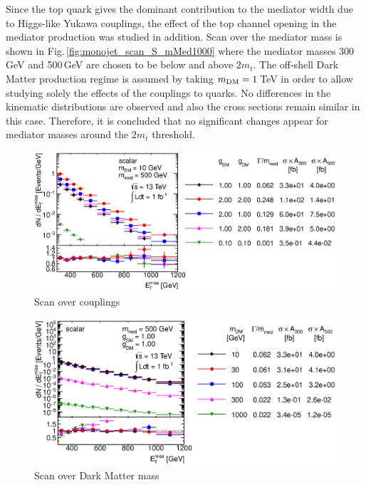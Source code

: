 Since the top quark gives the dominant contribution to the mediator width due to Higgs-like Yukawa couplings, the effect of the top channel opening in the mediator production was studied in addition. Scan over the mediator mass is shown in Fig.\,\ref{fig:monojet_scan_S_mMed1000} where the mediator masses 300\,GeV and 500\,GeV are chosen to be below and above $2m_t$. The off-shell Dark Matter production regime is assumed by taking $m_{\rm{DM}}=1$\,TeV in order to allow studying solely the effects of the couplings to quarks. 
No differences in the kinematic distributions are observed and also the cross sections remain similar in this case. Therefore, it is concluded that no significant changes appear for mediator masses around the $2m_t$ threshold.

\begin{figure}
\centering
\includegraphics[width=0.9\linewidth]{figures/monojet/scan_g_S_10_500.eps}
\caption{Scan over couplings}
\label{fig:monojet_scan_S_g}
\end{figure}

\begin{figure}
\centering
\includegraphics[width=0.9\linewidth]{figures/monojet/scan_mDM_S_500.eps}
\caption{Scan over Dark Matter mass}
\label{fig:monojet_scan_S_mDM1000}
\end{figure}

